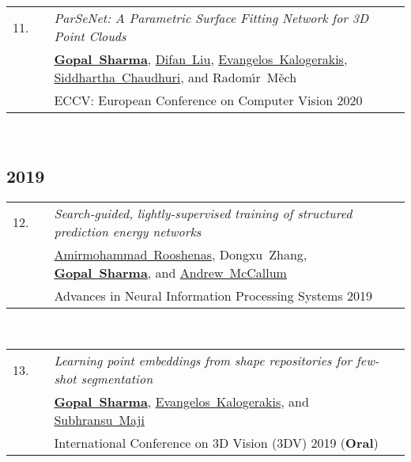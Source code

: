 \documentclass[11pt,letter,sans]{moderncv}
\begin{document}
\begin{minipage}{\textwidth}
\begin{tabular}[t]{p{8mm}p{1mm}>{\raggedright\arraybackslash}p{6.5in}}
 \hfill11.\hspace*{1mm} && \textit{ParSeNet: A Parametric Surface Fitting Network for 3D Point Clouds}  \\
 && \mbox{\textbf{\href{hippogriff.github.io}{Gopal Sharma}}}, \mbox{\href{}{Difan Liu}}, \mbox{\href{}{Evangelos Kalogerakis}}, \mbox{\href{}{Siddhartha Chaudhuri}}, and \mbox{Radom{\'\i}r M{\v{e}}ch} \\
 && ECCV: European Conference on Computer Vision 2020  \\
\end{tabular} \\[2mm]
\end{minipage}
\subsection{2019}

\begin{minipage}{\textwidth}
\begin{tabular}[t]{p{8mm}p{1mm}>{\raggedright\arraybackslash}p{6.5in}}
 \hfill12.\hspace*{1mm} && \textit{Search-guided, lightly-supervised training of structured prediction energy networks}  \\
 && \mbox{\href{}{Amirmohammad Rooshenas}}, \mbox{Dongxu Zhang}, \mbox{\textbf{\href{hippogriff.github.io}{Gopal Sharma}}}, and \mbox{\href{}{Andrew McCallum}} \\
 && Advances in Neural Information Processing Systems 2019  \\
\end{tabular} \\[2mm]
\end{minipage}

\begin{minipage}{\textwidth}
\begin{tabular}[t]{p{8mm}p{1mm}>{\raggedright\arraybackslash}p{6.5in}}
 \hfill13.\hspace*{1mm} && \textit{Learning point embeddings from shape repositories for few-shot segmentation}  \\
 && \mbox{\textbf{\href{hippogriff.github.io}{Gopal Sharma}}}, \mbox{\href{}{Evangelos Kalogerakis}}, and \mbox{\href{}{Subhransu Maji}} \\
 && 2019 International Conference on 3D Vision (3DV) 2019 (\textbf{Oral}) \\
\end{tabular} \\[2mm]
\end{minipage}
\end{document}
